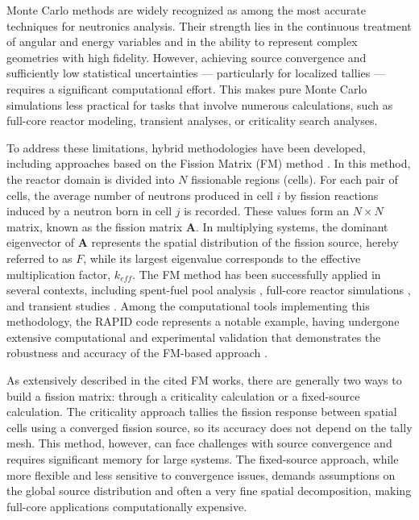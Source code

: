 \documentclass[letterpaper]{physor2026}
\begin{document}

Monte Carlo methods are widely recognized as among the most accurate techniques for neutronics analysis. Their strength lies in the continuous treatment of angular and energy variables and in the ability to represent complex geometries with high fidelity. However, achieving source convergence and sufficiently low statistical uncertainties — particularly for localized tallies — requires a significant computational effort. This makes pure Monte Carlo simulations less practical for tasks that involve numerous calculations, such as full-core reactor modeling, transient analyses, or criticality search analyses.   

To address these limitations, hybrid methodologies have been developed, including approaches based on the Fission Matrix (FM) method \cite{Carney2014}. In this method, the reactor domain is divided into $N$ fissionable regions (cells). For each pair of cells, the average number of neutrons produced in cell $i$ by fission reactions induced by a neutron born in cell $j$ is recorded. These values form an $N \times N$ matrix, known as the fission matrix $\mathbf{A}$. In multiplying systems, the dominant eigenvector of $\mathbf{A}$ represents the spatial distribution of the fission source, hereby referred to as  $F$, while its largest eigenvalue corresponds to the effective multiplication factor, $k_{eff}$.
The FM method has been successfully applied in several contexts, including spent-fuel pool analysis \cite{Walter00}, full-core reactor simulations \cite{Walters2018}, and transient studies \cite{Laureau2015}. 
Among the computational tools implementing this methodology, the RAPID code represents a notable example, having undergone extensive computational and experimental validation that demonstrates the robustness and accuracy of the FM-based approach \cite{RAU2020103273,Mascolino2022_triga,Mascolino_trapid}.

As extensively described in the cited FM works, there are generally two ways to build a fission matrix: through a criticality calculation or a fixed-source calculation. The criticality approach tallies the fission response between spatial cells using a converged fission source, so its accuracy does not depend on the tally mesh. This method, however, can face challenges with source convergence and requires significant memory for large systems.  
The fixed-source approach, while more flexible and less sensitive to convergence issues, demands assumptions on the global source distribution and often a very fine spatial decomposition, making full-core applications computationally expensive.
\end{document}
